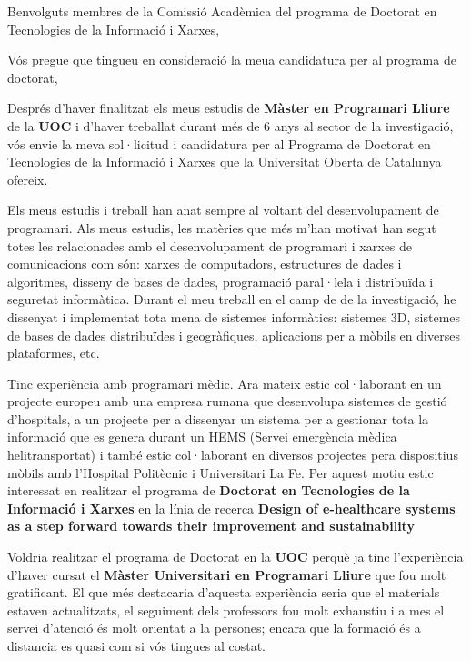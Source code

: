 
%
%


\date{\today}
\opening{Benvolguts membres de la Comissió Acadèmica del programa de Doctorat en Tecnologies de la Informació i Xarxes,}
\closing{Vós pregue que tingueu en consideració la meua candidatura per al programa de doctorat,}




\makelettertitle

Després d'haver finalitzat els meus estudis de \textbf{Màster en Programari Lliure} de la \textbf{UOC} i d'haver treballat durant més de 6 anys al sector de la investigació, vós envie la meva sol·licitud i candidatura per al Programa de Doctorat en Tecnologies de la Informació i Xarxes que la Universitat Oberta de Catalunya ofereix.

Els meus estudis i treball han anat sempre al voltant del desenvolupament de programari. Als meus estudis, les matèries que més m'han motivat han segut totes les relacionades amb el desenvolupament de programari i xarxes de comunicacions com són: xarxes de computadors, estructures de dades i algoritmes, disseny de bases de dades, programació paral·lela i distribuïda i seguretat informàtica. Durant el meu treball en el camp de de la investigació, he dissenyat i implementat tota mena de sistemes informàtics: sistemes 3D, sistemes de bases de dades distribuïdes i geogràfiques, aplicacions per a mòbils en diverses plataformes, etc.

Tinc experiència amb programari mèdic. Ara mateix estic col·laborant en un projecte europeu amb una empresa rumana que desenvolupa sistemes de gestió d'hospitals, a un projecte per a dissenyar un sistema per a gestionar tota la informació que es genera durant un HEMS (Servei emergència mèdica helitransportat) i també estic col·laborant en diversos projectes pera dispositius mòbils amb l'Hospital Politècnic i Universitari La Fe.  Per aquest motiu estic interessat en realitzar el programa de \textbf{Doctorat en Tecnologies de la Informació i Xarxes} en la línia de recerca \textbf{Design of e-healthcare systems as a step forward towards their improvement and sustainability} 

Voldria realitzar el programa de Doctorat en la \textbf{UOC} perquè ja tinc l'experiència d'haver cursat el \textbf{Màster Universitari en Programari Lliure} que fou molt gratificant. El que més destacaria d'aquesta experiència seria que el materials estaven actualitzats, el seguiment dels professors fou molt exhaustiu i a mes el servei d'atenció és molt orientat a la persones; encara que la formació és a distancia es quasi com si vós tingues al costat. 

\makeletterclosing

\clearpage